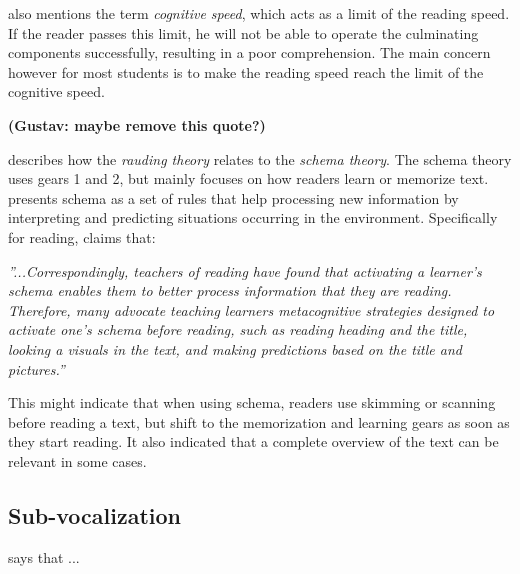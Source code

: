 \citeauthor{carver_reading_1992} also mentions the term \textit{cognitive speed}, which acts as a limit of the reading speed. If the reader passes this limit, he will not be able to operate the culminating components successfully, resulting in a poor comprehension. The main concern however for most students is to make the reading speed reach the limit of the cognitive speed.

\textbf{(Gustav: maybe remove this quote?)}

\citeauthor{carver_reading_1992} describes how the \textit{rauding theory} relates to the \textit{schema theory}. The schema theory uses gears 1 and 2, but mainly focuses on how readers learn or memorize text.  presents schema as a set of rules that help processing new information by interpreting and predicting situations occurring in the environment. Specifically for reading, \citeauthor{widmayer_schema_2005} claims that:

 \emph{''...Correspondingly, teachers of reading have found that activating a learner's schema enables them to better process information that they are reading. Therefore, many advocate teaching learners metacognitive strategies designed to activate one's schema before reading, such as reading heading and the title, looking a visuals in the text, and making predictions based on the title and pictures.''}

This might indicate that when using schema, readers use skimming or scanning before reading a text, but shift to the memorization and learning gears as soon as they start reading. It also indicated that a complete overview of the text can be relevant in some cases.


\subsection{Sub-vocalization}
 says that ...

